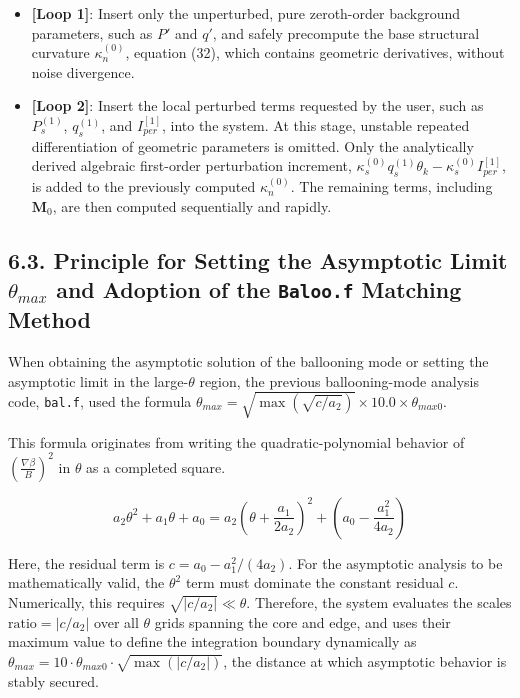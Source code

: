 \documentclass[11pt,a4paper]{article}
\begin{document}
\begin{itemize}
\item \textbf{[Loop 1]}: Insert only the unperturbed, pure zeroth-order background
  parameters, such as \(P'\) and \(q'\), and safely precompute the base structural
  curvature \(\kappa_n^{(0)}\), equation (32), which contains geometric
  derivatives, without noise divergence.
\item \textbf{[Loop 2]}: Insert the local perturbed terms requested by the user,
  such as \(P_s^{(1)}\), \(q_s^{(1)}\), and \(I_{per}^{[1]}\), into the system. At
  this stage, unstable repeated differentiation of geometric parameters is omitted.
  Only the analytically derived algebraic first-order perturbation increment,
  \(\kappa_s^{(0)}q_s^{(1)}\theta_k - \kappa_s^{(0)}I_{per}^{[1]}\), is added to the
  previously computed \(\kappa_n^{(0)}\). The remaining terms, including
  \(\mathbf{M}_0\), are then computed sequentially and rapidly.
\end{itemize}

\subsection{6.3. Principle for Setting the Asymptotic Limit \(\theta_{max}\) and Adoption of the \texttt{Baloo.f} Matching Method}\label{principle-for-setting-theta-max-and-adoption-of-baloo-f-matching-method}

When obtaining the asymptotic solution of the ballooning mode or setting the
asymptotic limit in the large-\(\theta\) region, the previous ballooning-mode
analysis code, \texttt{bal.f}, used the formula
\(\theta_{max} = \sqrt{\max(\sqrt{c/a_2})} \times 10.0 \times \theta_{max0}\).

This formula originates from writing the quadratic-polynomial behavior of
\((\frac{\nabla \beta}{B})^2\) in \(\theta\) as a completed square.

\[ a_2\theta^2 + a_1\theta + a_0 = a_2 \left( \theta + \frac{a_1}{2a_2} \right)^2 + \left( a_0 - \frac{a_1^2}{4a_2} \right) \tag{34} \]

Here, the residual term is \(c = a_0 - a_1^2 / (4a_2)\). For the asymptotic
analysis to be mathematically valid, the \(\theta^2\) term must dominate the
constant residual \(c\). Numerically, this requires
\(\sqrt{|c/a_2|} \ll \theta\). Therefore, the system evaluates the scales
\(\text{ratio} = |c/a_2|\) over all \(\theta\) grids spanning the core and edge, and
uses their maximum value to define the integration boundary dynamically as
\(\theta_{max} = 10 \cdot \theta_{max0} \cdot \sqrt{\max(|c/a_2|)}\), the distance
at which asymptotic behavior is stably secured.
\end{document}
